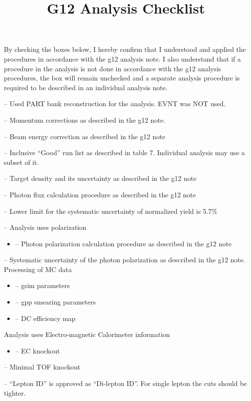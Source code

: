 \documentclass[11pt]{article}
\title{G12 Analysis Checklist}
\let\oldmarginpar\marginpar
\renewcommand\marginpar[1]{\-\oldmarginpar[\raggedleft #1]%
{\raggedright #1}}
\newenvironment{checklist}{%
  \begin{list}{}{}%
  \let\olditem\item
  \renewcommand\item{\olditem -- \marginpar{$\Box$} }
  \newcommand\checkeditem{\olditem -- \marginpar{$\CheckedBox$} }
}{%
  \end{list}
}
\begin{document}
\maketitle
By checking the boxes below, I hereby confirm that I understood and applied the procedures in accordance with the g12 analysis note. I also understand that if a procedure in the analysis is not done in accordance with the g12 analysis procedures, the box will remain unchecked and a separate analysis procedure is required to be described in an individual analysis note.
\begin{checklist}
\item Used PART bank reconstruction for the analysis. EVNT was NOT used.
\item Momentum corrections as described in the g12 note.
\item Beam energy correction as described in the g12 note
\item Inclusive “Good” run list as described in table 7. Individual analysis may use a subset of it.
\item Target density and its uncertainty as described in the g12 note
\item Photon flux calculation procedure as described in the g12 note
\item Lower limit for the systematic uncertainty of normalized yield is 5.7\%
\item Analysis uses polarization
\begin{itemize}
\item Photon polarization calculation procedure as described in the g12 note
\end{itemize}
\item Systematic uncertainty of the photon polarization as described in the g12 note.\\ 
Processing of MC data
\begin{itemize}
\item gsim parameters
\item gpp smearing parameters
\item DC efficiency map
\end{itemize}
Analysis uses Electro-magnetic Calorimeter information
\begin{itemize}
\item EC knockout
\end{itemize}
\item Minimal TOF knockout
\item “Lepton ID” is approved as “Di-lepton ID”. For single lepton the cuts should be tighter.
\end{checklist}
\end{document}
